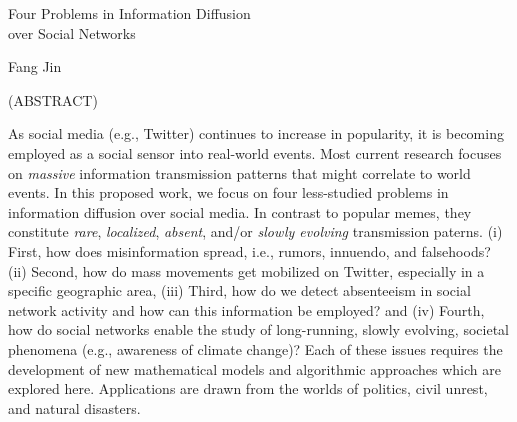 \documentclass[12pt,dvips]{report}
\begin{document}
\thispagestyle{empty}
\begin{center}

{\large
Four Problems in Information Diffusion \\
over Social Networks
}

\vfill

Fang Jin

\vfill

(ABSTRACT)
\vfill

\end{center}
As social media (e.g., Twitter) continues to increase in popularity, it is becoming employed
as a social sensor into real-world events. Most current research focuses on 
{\it massive} information transmission patterns that might correlate to world events.
In this proposed work, we focus on four less-studied problems in information
diffusion over social media. In contrast to popular memes, they constitute 
{\it rare}, {\it localized}, {\it absent}, and/or {\it slowly evolving} transmission paterns. 
(i) First, how does misinformation spread, i.e.,
rumors, innuendo, and falsehoods? (ii) Second, how do mass movements get mobilized
on Twitter, especially in a specific geographic area, (iii) Third, how do we detect
absenteeism in social network activity and how can this information be employed?
and (iv) Fourth, how do social
networks enable the study of long-running, slowly evolving, societal phenomena (e.g., awareness
of climate change)?
Each of these issues requires the development of new mathematical models and algorithmic
approaches which are explored here. Applications are drawn from the worlds of politics,
civil unrest, and natural disasters.
\end{document}
